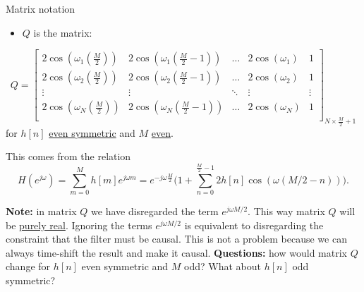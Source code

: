 \documentclass[10pt, handout]{beamer}
\begin{document}
\begin{frame}{Matrix notation}
	\begin{itemize}
		\item $Q$ is the matrix:
	\end{itemize}
		\begin{equation*}
			Q = \begin{bmatrix}
			2\cos(\omega_1(\frac{M}{2})) & 2\cos(\omega_1(\frac{M}{2}-1)) &\ldots & 2\cos(\omega_1) & 1 \\
			2\cos(\omega_2(\frac{M}{2})) & 2\cos(\omega_2(\frac{M}{2}-1)) & \ldots & 2\cos(\omega_2) & 1 \\
			\vdots & \vdots & \ddots & \vdots & \vdots \\
			2\cos(\omega_N(\frac{M}{2})) & 2\cos(\omega_N(\frac{M}{2}-1)) & \ldots & 2\cos(\omega_N) & 1	\\		
			\end{bmatrix}_{N\times \frac{M}{2} + 1}
		\end{equation*}
		for $h[n]$ \underline{even symmetric} and $M$ \underline{even}.
		
		This comes from the relation
		\begin{equation*}
		H(e^{j\omega}) = \sum_{m = 0}^{M}h[m]e^{j\omega m} = e^{-j\omega\frac{M}{2}}\bigg(1 + \displaystyle\sum_{n = 0}^{\frac{M}{2}-1}2h[n]\cos(\omega(M/2-n))\bigg). \tag{DTFT of symmetryic FIR $h[n]$}
		\end{equation*}

		\vspace{0.25cm}
		\textbf{Note:} in matrix $Q$ we have disregarded the term $e^{j\omega M/2}$. This way matrix $Q$ will be \underline{purely real}. Ignoring the terms $e^{j\omega M/2}$ is equivalent to disregarding the constraint that the filter must be causal. This is not a problem because we can always time-shift the result and make it causal.
		\pause 
		\textbf{Questions:} how would matrix $Q$ change for $h[n]$ even symmetric and $M$ odd? What about $h[n]$ odd symmetric?
\end{frame}
\end{document}
